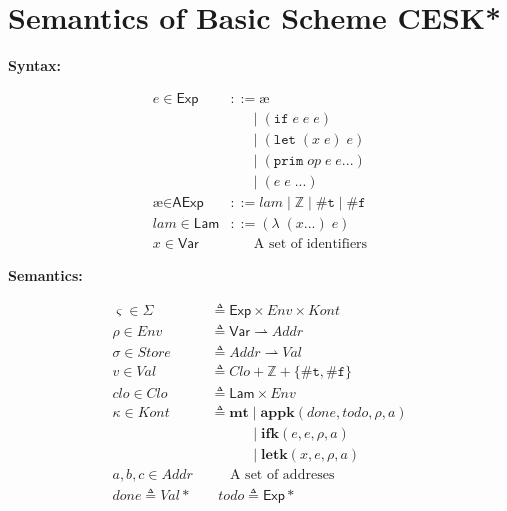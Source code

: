\documentclass[12pt,draft]{article}
\newcommand\mae{\ensuremath{\text{\ae}}}
\begin{document}
\newcommand{\lamsyn}[2]{(\lambda\;(#1 ...)\;#2)}
\newcommand{\letsyn}[3]{(\texttt{let}\;(#1\;#2)\;#3)}
\newcommand{\ifsyn}[3]{(\texttt{if}\;#1\;#2\;#3)}
\newcommand{\primsyn}[3]{(\texttt{prim}\;#1\;#2\;#3 ...)}
\newcommand{\truesyn}{\texttt{\#t}}
\newcommand{\falsesyn}{\texttt{\#f}}


\section{Semantics of Basic Scheme CESK*}


\begin{center}
\textbf{Syntax:}
\end{center}
\vspace{-7mm}
\begin{align*}
e \in \textsf{Exp} &::= \mae \\
				  &	\;\;\;\;\; \;|\; \ifsyn{e}{e}{e}  \\
				  &	\;\;\;\;\; \;|\; \letsyn{x}{e}{e} \\
				  &	\;\;\;\;\; \;|\; \primsyn{op}{e}{e} \\
				  &	\;\;\;\;\; \;|\; (e \; e \; ...) \\
\mae \in \textsf{AExp} &::= lam \;|\; \mathbb{Z} \;|\; \truesyn \;|\; \falsesyn \\
lam \in \textsf{Lam} &::= \lamsyn{x}{e} \\
x \in \textsf{Var} &\;\;\;\;\;\; \text{A set of identifiers}
\end{align*}
\vspace{-10mm}
\begin{center}
\textbf{Semantics:}
\end{center}
\vspace{-7mm}
\begin{align*}
\varsigma \in \Sigma &\triangleq \textsf{Exp} \times \textit{Env} \times \textit{Kont} \\
\rho \in \textit{Env} &\triangleq \textsf{Var} \rightharpoonup \textit{Addr} \\
\sigma \in \textit{Store} &\triangleq \textit{Addr} \rightharpoonup \textit{Val} \\
v \in \textit{Val} &\triangleq \textit{Clo} + \mathbb{Z} + \{\truesyn, \falsesyn\} \\
clo \in \textit{Clo} &\triangleq \textsf{Lam} \times \textit{Env} \\
\kappa \in \textit{Kont} &\triangleq \textbf{mt} \;|\; \textbf{appk}(done, todo, \rho, a) \\
					   &	\;\;\;\;\;\;\;\;\;\; \;|\; \textbf{ifk}(e, e, \rho, a) \\
					   &	\;\;\;\;\;\;\;\;\;\; \;|\; \textbf{letk}(x, e, \rho, a) \\
a,b,c \in \textit{Addr} &\;\;\;\;\; \text{A set of addreses} \\
done \triangleq \textit{Val}* \;\;&\;\; todo \triangleq \textsf{Exp}*
\end{align*}
\end{document}
